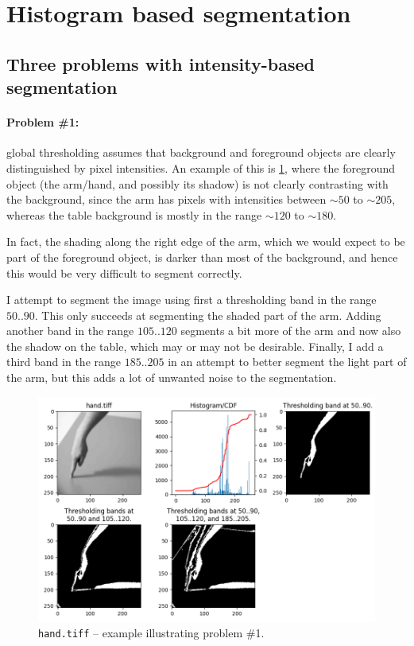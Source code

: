 \newpage
\section{Histogram based segmentation}

\subsection{Three problems with intensity-based segmentation}


\paragraph{Problem \#1:} global thresholding assumes that background and
foreground objects are clearly distinguished by pixel intensities. An example of
this is \cref{fig:hand}, where the foreground object (the arm/hand, and possibly
its shadow) is not clearly contrasting with the background, since the arm has
pixels with intensities between $\sim 50$ to $\sim 205$, whereas the table
background is mostly in the range $\sim 120$ to $\sim 180$. 

In fact, the shading along the right edge of the arm, which we would expect to
be part of the foreground object, is darker than most of the background, and
hence this would be very difficult to segment correctly.

I attempt to segment the image using first a thresholding band in the range
$50..90$. This only succeeds at segmenting the shaded part of the arm. Adding
another band in the range $105..120$ segments a bit more of the arm and now also
the shadow on the table, which may or may not be desirable. Finally, I add a
third band in the range $185..205$ in an attempt to better segment the light
part of the arm, but this adds a lot of unwanted noise to the segmentation.



\begin{figure}[H]
  \centering
  \includegraphics[width=\textwidth]{figures/task_5_1_example1.png}
  \caption{\texttt{hand.tiff} -- example illustrating problem \#1.}
  \label{fig:hand}
\end{figure}


